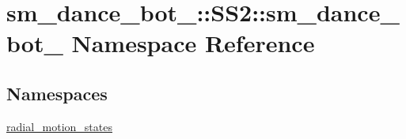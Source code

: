 \hypertarget{namespacesm__dance__bot__3_1_1SS2_1_1sm__dance__bot__3}{}\section{sm\+\_\+dance\+\_\+bot\+\_\+:\+:S\+S2\+:\+:sm\+\_\+dance\+\_\+bot\+\_ Namespace Reference}
\label{namespacesm__dance__bot__3_1_1SS2_1_1sm__dance__bot__3}
\subsection*{Namespaces}
\begin{DoxyCompactItemize}
\item 
 \hyperlink{namespacesm__dance__bot__3_1_1SS2_1_1sm__dance__bot__3_1_1radial__motion__states}{radial\+\_\+motion\+\_\+states}
\end{DoxyCompactItemize}
